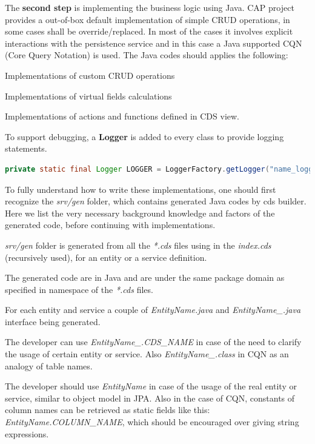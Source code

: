 The \textbf{second step} is implementing the business logic using Java. CAP project provides a out-of-box default implementation of simple CRUD \cite{crud} operations, in some cases shall be override/replaced. In most of the cases it involves explicit interactions with the persistence service and in this case a Java supported CQN (Core Query Notation) \cite{cap-cds-cqn} is used. The Java codes should applies the following:
\begin{compactenum}
	\item Implementations of custom CRUD operations
	\item Implementations of virtual fields calculations
	\item Implementations of actions and functions defined in CDS view.
\end{compactenum}

\bigskip
To support debugging, a \textbf{Logger} is added to every class to provide logging statements.

\begin{lstlisting}[language={java}]
 private static final Logger LOGGER = LoggerFactory.getLogger("name_logger");
\end{lstlisting}

\bigskip
To fully understand how to write these implementations, one should first recognize the \textit{srv/gen} folder, which contains generated Java codes by cds builder. Here we list the very necessary background knowledge and factors of the generated code, before continuing with implementations. 
\begin{compactenum}
	\item \textit{srv/gen} folder is generated from all the \textit{*.cds} files using in the \textit{index.cds} (recursively used), for an entity or a service definition.
    \item The generated code are in Java and are under the same package domain as specified in namespace of the \textit{*.cds} files.
    \item For each entity and service a couple of \textit{EntityName.java} and \textit{EntityName\_.java} interface being generated. 
    \item The developer can use \textit{EntityName\_.CDS\_NAME} in case of the need to clarify the usage of certain entity or service. Also \textit{EntityName\_.class} in CQN as an analogy of table names. 
    \item The developer should use \textit{EntityName} in case of the usage of the real entity or service, similar to object model in JPA. Also in the case of CQN, constants of column names can be retrieved as static fields like this: \textit{EntityName.COLUMN\_NAME}, which should be encouraged over giving string expressions.
\end{compactenum}

